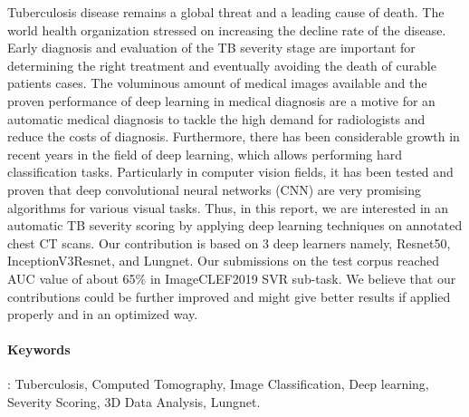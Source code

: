 Tuberculosis disease remains a global threat and a leading cause of death. The world health organization stressed on increasing the decline rate of the disease. Early diagnosis and evaluation of the TB severity stage are important for determining the right treatment and eventually avoiding the death of curable patients cases. The voluminous amount of medical images available and the proven performance of deep learning in medical diagnosis are a motive for an automatic medical diagnosis to tackle the high demand for radiologists and reduce the costs of diagnosis. Furthermore, there has been considerable growth in recent years in the field of deep learning, which allows performing hard classification tasks.  Particularly in computer vision fields, it has been tested and proven that deep convolutional neural networks (CNN) are very promising algorithms for various visual tasks. Thus, in this report, we are interested in an automatic TB severity scoring by applying deep learning techniques on annotated chest CT scans. Our contribution is based on 3 deep learners namely, Resnet50, InceptionV3Resnet, and Lungnet. Our submissions on the test corpus reached AUC value of about 65\% in ImageCLEF2019 SVR sub-task. We believe that our contributions could be further improved and might give better results if applied properly and in an optimized way.
\paragraph{Keywords}: Tuberculosis, Computed Tomography, Image Classification, Deep learning, Severity Scoring, 3D Data Analysis, Lungnet.